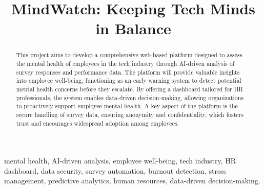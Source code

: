 \documentclass[conference]{IEEEtran}
\begin{document}
\title{MindWatch: Keeping Tech Minds in Balance\\
{\footnotesize \textsuperscript{}}
}

\author{
\and
{}
\and
{}
\and
{}
}

\maketitle

\begin{abstract}
    This project aims to develop a comprehensive web-based
    platform designed to assess the mental health of employees in
    the tech industry through AI-driven analysis of survey
    responses and performance data. The platform will provide
    valuable insights into employee well-being, functioning as an
    early warning system to detect potential mental health concerns
    before they escalate. By offering a dashboard tailored for HR
    professionals, the system enables data-driven decision-making,
    allowing organizations to proactively support employee mental
    health. A key aspect of the platform is the secure handling of
    survey data, ensuring anonymity and confidentiality, which
    fosters trust and encourages widespread adoption among
    employees.
\end{abstract}

\begin{IEEEkeywords}
    mental health, AI-driven analysis, employee well-being, tech 
    industry, HR dashboard, data security, survey automation, burnout 
    detection, stress management, predictive analytics, human resources,
     data-driven decision-making.
\end{IEEEkeywords}
\end{document}
